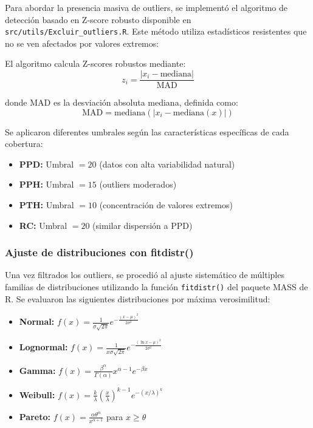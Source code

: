 Para abordar la presencia masiva de outliers, se implementó el algoritmo de detección basado en Z-score robusto disponible en \texttt{src/utils/Excluir\_outliers.R}. Este método utiliza estadísticos resistentes que no se ven afectados por valores extremos:

El algoritmo calcula Z-scores robustos mediante:
\begin{equation*}
z_i = \frac{|x_i - \text{mediana}|}{\text{MAD}}
\end{equation*}

donde MAD es la desviación absoluta mediana, definida como:
\begin{equation*}
\text{MAD} = \text{mediana}(|x_i - \text{mediana}(x)|)
\end{equation*}

Se aplicaron diferentes umbrales según las características específicas de cada cobertura:
\begin{itemize}
    \item \textbf{PPD:} Umbral $= 20$ (datos con alta variabilidad natural)
    \item \textbf{PPH:} Umbral $= 15$ (outliers moderados)  
    \item \textbf{PTH:} Umbral $= 10$ (concentración de valores extremos)
    \item \textbf{RC:} Umbral $= 20$ (similar dispersión a PPD)
\end{itemize}

\subsubsection{Ajuste de distribuciones con fitdistr()}

Una vez filtrados los outliers, se procedió al ajuste sistemático de múltiples familias de distribuciones utilizando la función \texttt{fitdistr()} del paquete MASS de R. Se evaluaron las siguientes distribuciones por máxima verosimilitud:

\begin{itemize}
    \item \textbf{Normal:} $f(x) = \frac{1}{\sigma\sqrt{2\pi}} e^{-\frac{(x-\mu)^2}{2\sigma^2}}$
    \item \textbf{Lognormal:} $f(x) = \frac{1}{x\sigma\sqrt{2\pi}} e^{-\frac{(\ln x-\mu)^2}{2\sigma^2}}$
    \item \textbf{Gamma:} $f(x) = \frac{\beta^\alpha}{\Gamma(\alpha)} x^{\alpha-1} e^{-\beta x}$
    \item \textbf{Weibull:} $f(x) = \frac{k}{\lambda}\left(\frac{x}{\lambda}\right)^{k-1} e^{-(x/\lambda)^k}$
    \item \textbf{Pareto:} $f(x) = \frac{\alpha \theta^\alpha}{x^{\alpha+1}}$ para $x \geq \theta$
\end{itemize}

